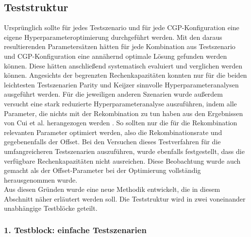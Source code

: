\subsection{Teststruktur}
\label{subsec:struktur}

Ursprünglich sollte für jedes Testszenario und für jede CGP-Konfiguration eine eigene Hyperparameteroptimierung durchgeführt werden.
Mit den daraus resultierenden Parametersätzen hätten für jede Kombination aus Testszenario und CGP-Konfiguration eine annähernd optimale Lösung gefunden werden können.
Diese hätten anschließend systematisch evaluiert und verglichen werden können.
Angesichts der begrenzten Rechenkapazitäten konnten nur für die beiden leichtesten Testszenarien Parity und Keijzer sinnvolle Hyperparameteranalysen ausgeführt werden.
Für die jeweiligen anderen Szenarien wurde außerdem versucht eine stark reduzierte Hyperparameteranalyse auszuführen, indem alle Parameter, die nichts mit der Rekombination zu tun haben aus den Ergebnissen von Cui et al. herangezogen werden \cite{cui_results}.
So sollten nur die für die Rekombination relevanten Parameter optimiert werden, also die Rekombinationsrate und gegebenenfalls der Offset.
Bei den Versuchen dieses Testverfahren für die umfangreicheren Testszenarien auszuführen, wurde ebenfalls festgestellt, dass die verfügbare Rechenkapazitäten nicht ausreichen.
Diese Beobachtung wurde auch gemacht als der Offset-Parameter bei der Optimierung vollständig herausgenommen wurde.\\
Aus diesen Gründen wurde eine neue Methodik entwickelt, die in diesem Abschnitt näher erläutert werden soll.
Die Teststruktur wird in zwei voneinander unabhängige Testblöcke geteilt.

\subsubsection{1. Testblock: einfache Testszenarien}
\label{subsub:ersterTestblock}

